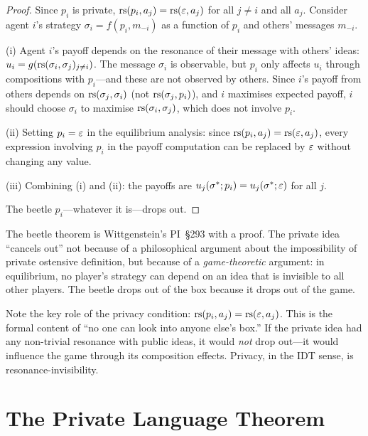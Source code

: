 \begin{proof}
Since $p_i$ is private, $\mathrm{rs}(p_i, a_j) = \mathrm{rs}(\varepsilon, a_j)$ for
all $j \ne i$ and all $a_j$.  Consider agent $i$'s strategy
$\sigma_i = f(p_i, m_{-i})$ as a function of $p_i$ and others'
messages $m_{-i}$.

(i) Agent $i$'s payoff depends on the resonance of their message
with others' ideas: $u_i = g(\mathrm{rs}(\sigma_i, \sigma_j)_{j \ne i})$.
The message $\sigma_i$ is observable, but $p_i$ only affects $u_i$
through compositions with $p_i$---and these are not observed by
others.  Since $i$'s payoff from others depends on $\mathrm{rs}(\sigma_j,
\sigma_i)$ (not $\mathrm{rs}(\sigma_j, p_i)$), and $i$ maximises expected
payoff, $i$ should choose $\sigma_i$ to maximise $\mathrm{rs}(\sigma_i,
\sigma_j)$, which does not involve $p_i$.

(ii) Setting $p_i = \varepsilon$ in the equilibrium analysis:
since $\mathrm{rs}(p_i, a_j) = \mathrm{rs}(\varepsilon, a_j)$, every expression
involving $p_i$ in the payoff computation can be replaced
by $\varepsilon$ without changing any value.

(iii) Combining (i) and (ii): the payoffs are
$u_j(\sigma^*; p_i) = u_j(\sigma^*; \varepsilon)$ for all $j$.

The beetle $p_i$---whatever it is---drops out.
\end{proof}

\begin{interpretation}
The beetle theorem is Wittgenstein's PI~\S293 with a proof.
The private idea ``cancels out'' not because of a philosophical
argument about the impossibility of private ostensive definition,
but because of a \emph{game-theoretic} argument: in equilibrium,
no player's strategy can depend on an idea that is invisible to
all other players.  The beetle drops out of the box because it
drops out of the game.

Note the key role of the privacy condition: $\mathrm{rs}(p_i, a_j) =
\mathrm{rs}(\varepsilon, a_j)$.  This is the formal content of ``no one can
look into anyone else's box.''  If the private idea had any
non-trivial resonance with public ideas, it would \emph{not}
drop out---it would influence the game through its composition
effects.  Privacy, in the IDT sense, is resonance-invisibility.
\end{interpretation}

\section{The Private Language Theorem}
\label{sec:private-language}

